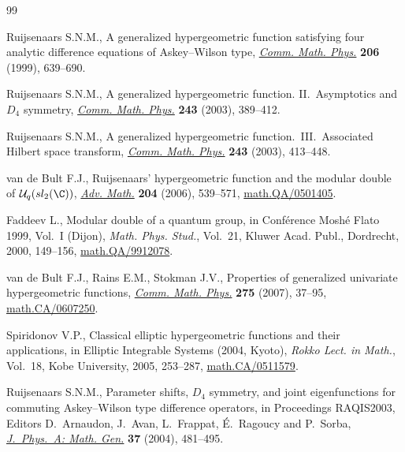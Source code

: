 \documentclass[pdftex]{sigma}
\numberwithin{equation}{section}
\begin{document}
\begin{thebibliography}{99}

\footnotesize\itemsep=0pt


Ruijsenaars S.N.M.,
A generalized hypergeometric function satisfying four analytic dif\/ference equations of Askey--Wilson type,
\href{http://dx.doi.org/10.1007/s002200050840}{{\it Comm. Math. Phys.}} {\bf 206} (1999), 639--690.


Ruijsenaars S.N.M.,
A generalized hypergeometric function. II.~Asymptotics and $D_4$ symmetry,
\href{http://dx.doi.org/10.1007/s00220-003-0969-3}{{\it Comm. Math. Phys.}} {\bf 243} (2003), 389--412.

Ruijsenaars S.N.M.,
A generalized hypergeometric function.~III.~Associated Hilbert space transform,
\href{http://dx.doi.org/10.1007/s00220-003-0970-x}{{\it Comm. Math. Phys.}} {\bf 243} (2003), 413--448.

van de Bult F.J.,
Ruijsenaars' hypergeometric function and the modular double of ${\mathcal U}_q(sl_2(\C))$,
\href{http://dx.doi.org/10.1016/j.aim.2005.05.023}{{\it Adv. Math.}}  {\bf 204} (2006), 539--571,
\href{http://arxiv.org/abs/math.QA/0501405}{math.QA/0501405}.

Faddeev L.,
Modular double of a quantum group,
in  Conf\'erence Mosh\'e Flato 1999, Vol.~I (Dijon),
{\it Math. Phys. Stud.}, Vol.~21, Kluwer Acad. Publ., Dordrecht, 2000, 149--156,
\href{http://arxiv.org/abs/math.QA/9912078}{math.QA/9912078}.



van de Bult F.J., Rains E.M., Stokman J.V.,
Properties of generalized univariate hypergeometric functions,
\href{http://dx.doi.org/10.1007/s00220-007-0289-0}{{\it Comm. Math. Phys.}} {\bf 275} (2007), 37--95,
\href{http://arxiv.org/abs/math.CA/0607250}{math.CA/0607250}.

Spiridonov V.P.,
Classical elliptic hypergeometric functions and their applications,
in Elliptic Integrable Systems (2004, Kyoto),
{\it Rokko Lect. in Math.}, Vol.~18,   Kobe University,   2005, 253--287,
\href{http://arxiv.org/abs/math.CA/0511579}{math.CA/0511579}.

Ruijsenaars S.N.M.,
Parameter shifts, $D_4$ symmetry, and joint  eigenfunctions for commuting  Askey--Wilson type dif\/ference operators,
 in Proceedings RAQIS2003, Editors D.~Arnaudon, J.~Avan,  L.~Frappat, \'E.~Ragoucy  and
P.~Sorba,
\href{http://dx.doi.org/10.1088/0305-4470/37/2/016}{{\it J.~Phys.~A: Math. Gen.}} {\bf 37} (2004), 481--495.


\end{thebibliography}
\end{document}
